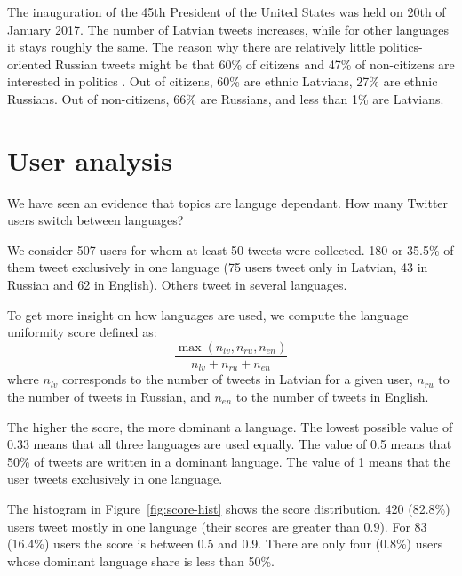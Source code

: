 \documentclass[11pt,a4paper]{article}
\begin{document}
The inauguration of the 45th President of the United States was held on 20th of January 2017. The number of Latvian tweets increases, while for other languages it stays roughly the same. The reason why there are relatively little politics-oriented Russian tweets might be that 60\% of citizens and 47\% of non-citizens are interested in politics \cite{civicsociety}. Out of citizens, 60\% are ethnic Latvians, 27\% are ethnic Russians. Out of non-citizens, 66\% are Russians, and less than 1\% are Latvians.

\section{User analysis}
\label{sec:lang-use}

We have seen an evidence that topics are languge dependant. How many Twitter users switch between languages?

We consider 507 users for whom at least 50 tweets were collected. 180 or 35.5\% of them tweet exclusively in one language (75 users tweet only in Latvian, 43 in Russian and 62 in English). Others tweet in several languages.

To get more insight on how languages are used, we compute the language uniformity score defined as:
\begin{equation}
  \label{eq:score}
  \frac{\max(n_\mathit{lv}, n_\mathit{ru}, n_\mathit{en})}{n_\mathit{lv} + n_\mathit{ru} + n_\mathit{en}}
\end{equation}
where $n_\mathit{lv}$ corresponds to the number of tweets in Latvian for a given user, $n_\mathit{ru}$ to the number of tweets in Russian, and $n_\mathit{en}$ to the number of tweets in English.

The higher the score, the more dominant a language. The lowest possible value of 0.33 means that all three languages are used equally. The value of 0.5 means that 50\% of tweets are written in a dominant language. The value of 1 means that the user tweets exclusively in one language.

The histogram in Figure~\ref{fig:score-hist} shows the score distribution. 420 (82.8\%) users tweet mostly in one language (their scores are greater than 0.9). For 83  (16.4\%) users the score is between 0.5 and 0.9. There are only four (0.8\%) users whose dominant language share is less than 50\%.
\end{document}
